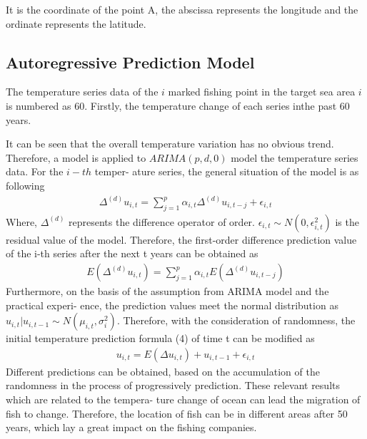 \documentclass[12pt]{article}  %
\begin{document}
It is the coordinate of the point A, the abscissa represents the longitude and the
ordinate represents the latitude.

\subsection{Autoregressive Prediction Model}
The temperature series data of the $i$ marked fishing point in the
target sea area $i$ is numbered as 60. 
Firstly, the temperature change of each series inthe past 60 years.

It can be seen that the overall temperature variation has no obvious trend. Therefore, a
model is applied to $ARIMA(p, d, 0)$ model the temperature series data. For the $i-th$ temper-
ature series, the general situation of the model is as following
\begin{align} %
    \Delta ^{(d)}u_{i,t} = \sum_{j=1}^{p}\alpha_{i,t}\Delta ^{(d)}u_{i,t-j} + \epsilon _{i,t}
\end{align}
Where, $\Delta ^{(d)}$ represents the difference operator of order. $\epsilon _{i,t} \sim N(0, \epsilon ^{2}_{i,t})$
is the residual value
of the model. Therefore, the first-order difference prediction value of the i-th series after the
next t years can be obtained as
\begin{align} %
    E(\Delta ^{(d)}u_{i,t}) = \sum_{j=1}^{p}\alpha_{i,t}E(\Delta ^{(d)}u_{i,t-j})
\end{align}
Furthermore, on the basis of the assumption from ARIMA model and the practical experi-
ence, the prediction values meet the normal distribution as $u_{i,t} | u_{i,t-1} \sim N(\mu_{i,t}, \sigma^{2}_{i})$. 
Therefore, with the consideration of randomness, the initial temperature prediction formula (4) of
time t can be modified as
\begin{align} %
    u_{i,t} = E(\Delta u_{i,t}) + u_{i,t-1} + \epsilon _{i,t}
\end{align}
Different predictions can be obtained, based on the accumulation of the randomness in the
process of progressively prediction. These relevant results which are related to the tempera-
ture change of ocean can lead the migration of fish to change. Therefore, the location of fish
can be in different areas after 50 years, which lay a great impact on the fishing companies.
\end{document}
